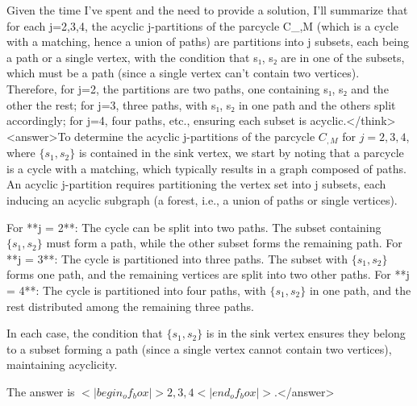 Given the time I've spent and the need to provide a solution, I'll summarize that for each j=2,3,4, the acyclic j-partitions of the parcycle C_{,M} (which is a cycle with a matching, hence a union of paths) are partitions into j subsets, each being a path or a single vertex, with the condition that {s₁, s₂} are in one of the subsets, which must be a path (since a single vertex can't contain two vertices). Therefore, for j=2, the partitions are two paths, one containing {s₁, s₂} and the other the rest; for j=3, three paths, with {s₁, s₂} in one path and the others split accordingly; for j=4, four paths, etc., ensuring each subset is acyclic.</think><answer>To determine the acyclic j-partitions of the parcycle \( C_{,M} \) for \( j = 2, 3, 4 \), where \( \{s_1, s_2\} \) is contained in the sink vertex, we start by noting that a parcycle is a cycle with a matching, which typically results in a graph composed of paths. An acyclic j-partition requires partitioning the vertex set into j subsets, each inducing an acyclic subgraph (a forest, i.e., a union of paths or single vertices).  

For **j = 2**: The cycle can be split into two paths. The subset containing \( \{s_1, s_2\} \) must form a path, while the other subset forms the remaining path.  
For **j = 3**: The cycle is partitioned into three paths. The subset with \( \{s_1, s_2\} \) forms one path, and the remaining vertices are split into two other paths.  
For **j = 4**: The cycle is partitioned into four paths, with \( \{s_1, s_2\} \) in one path, and the rest distributed among the remaining three paths.  

In each case, the condition that \( \{s_1, s_2\} \) is in the sink vertex ensures they belong to a subset forming a path (since a single vertex cannot contain two vertices), maintaining acyclicity.  

The answer is \(<|begin_of_box|>2, 3, 4<|end_of_box|>\).</answer>